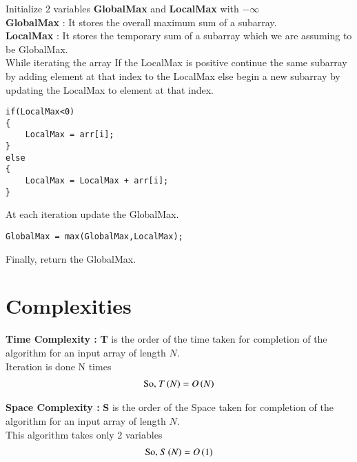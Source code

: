 \documentclass[journal,12pt,twocolumn]{IEEEtran}
\begin{document}
Initialize 2 variables \textbf{GlobalMax} and \textbf{LocalMax} with $-\infty$ \\
\textbf{GlobalMax} : It stores the overall maximum sum of a subarray. \\
\textbf{LocalMax} : It stores the temporary sum of a subarray which we are assuming to be GlobalMax.\\

While iterating the array If the LocalMax is positive continue the same subarray by adding element at that index to the LocalMax else begin a new subarray by updating the LocalMax to element at that index.\\

\begin{lstlisting}
if(LocalMax<0)
{
    LocalMax = arr[i];
}
else
{
    LocalMax = LocalMax + arr[i];
}
\end{lstlisting}

At each iteration update the GlobalMax.\\
\begin{lstlisting}
GlobalMax = max(GlobalMax,LocalMax);
\end{lstlisting}

Finally, return the GlobalMax.

\section{Complexities}

\textbf{Time Complexity :} \textbf{T} is the order of the time taken for completion of the algorithm for an input array of length $N$.\\
Iteration is done N times
\begin{align}
    \text{So, }T\left(N\right) = O\left(N\right)
\end{align}

\textbf{Space Complexity :}
\textbf{S} is the order of the Space taken for completion of the algorithm for an input array of length $N$.\\
This algorithm takes only 2 variables 
\begin{align}
    \text{So, }S\left(N\right) = O\left(1\right)
\end{align}
\end{document}
